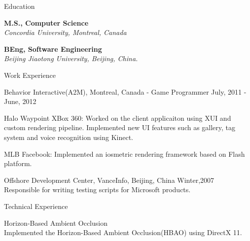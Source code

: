 \documentclass[10pt]{article}
\newenvironment{mydescription}{%
    \begin{description}
        \setlength{\itemsep}{0.25em}%
        \setlength{\parsep}{0em}%
        \setlength{\topsep}{\itemsep}%
        \setlength{\parskip}{0em}%
        \setlength{\labelwidth}{0.1em}
        \setlength{\labelsep}{0em} 
    }%
{\end{description}}
\begin{document}
\begin{cv}
\begin{cvlist}{Education}
    \item   \textbf{M.S., Computer Science}  \\ 
            \emph{Concordia University, Montreal, Canada}
    \item   \textbf{BEng, Software Engineering} \\
            \emph{Beijing Jiaotong University, Beijing, China.}
\end{cvlist}



\begin{cvlist}{Work Experience}
\item 
    \begin{mydescription}
		\item[Behavior Interactive(A2M), Montreal, Canada - Game Programmer]  \hfill July, 2011 - June, 2012 
			\begin{mydescription}
			\item[Halo Waypoint XBox 360: ] {Worked on the client applicaiton using XUI and custom rendering pipeline. Implemented new UI features such as gallery, tag system and voice recognition using Kinect. }
			\item[MLB Facebook: ] {Implemented an iosmetric rendering framework based on Flash platform. }
			\end{mydescription}
        	\item[Offshore Development Center, VanceInfo, Beijing, China] \hfill Winter,2007 \\ 
            Responsible for writing testing scripts for Microsoft products. 
    \end{mydescription}
\end{cvlist}


\begin{cvlist}{Technical Experience}
\item
    \begin{mydescription}
        \item[Horizon-Based Ambient Occlusion] \hfill \\
			Implemented the Horizon-Based Ambient Occlusion(HBAO) using DirectX 11. 


\end{mydescription}
\end{cvlist}
\end{cv}
\end{document}

